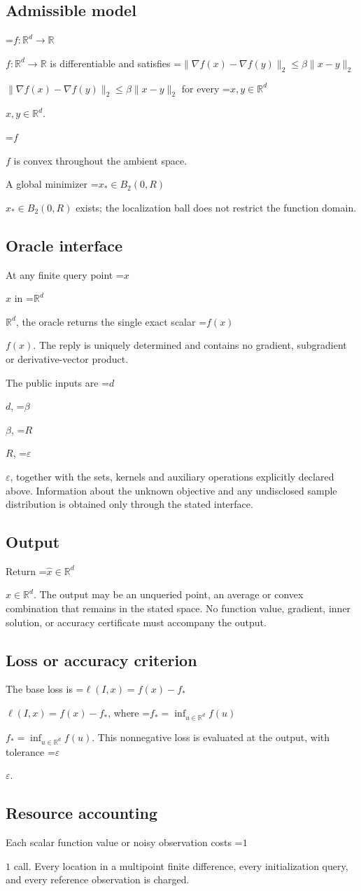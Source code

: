 \documentclass[10pt,a4paper]{article}
\newcommand{\AtlasMath}[1]{\par\begingroup\centering\setbox0=\hbox{$\displaystyle #1$}\ifdim\wd0>1.4\linewidth\typeout{ATLAS WIDE FORMULA: \the\wd0}\fi\ifdim\wd0>\linewidth\resizebox{\linewidth}{!}{\box0}\else\box0\fi\par\endgroup}
\newcommand{\AtlasInlineMath}[1]{\begingroup\setbox0=\hbox{$#1$}\ifdim\wd0>.4\linewidth\endgroup\AtlasMath{#1}\else\endgroup$#1$\fi}
\begin{document}
\subsection{Admissible model}
\AtlasInlineMath{f:\mathbb{R}^d\to\mathbb{R}} is differentiable and satisfies \AtlasInlineMath{\|\nabla f(x)-\nabla f(y)\|_2\le\beta\|x-y\|_2} for every \AtlasInlineMath{x,y\in\mathbb{R}^d}.

\AtlasInlineMath{f} is convex throughout the ambient space.

A global minimizer \AtlasInlineMath{x_*\in B_2(0,R)} exists; the localization ball does not restrict the function domain.

\subsection{Oracle interface}
At any finite query point \AtlasInlineMath{x} in \AtlasInlineMath{\mathbb{R}^d}, the oracle returns the single exact scalar \AtlasInlineMath{f(x)}. The reply is uniquely determined and contains no gradient, subgradient or derivative-vector product.

The public inputs are \AtlasInlineMath{d}, \AtlasInlineMath{\beta}, \AtlasInlineMath{R}, \AtlasInlineMath{\varepsilon}, together with the sets, kernels and auxiliary operations explicitly declared above. Information about the unknown objective and any undisclosed sample distribution is obtained only through the stated interface.

\subsection{Output}
Return \AtlasInlineMath{\widehat{x}\in \mathbb{R}^d}. The output may be an unqueried point, an average or convex combination that remains in the stated space. No function value, gradient, inner solution, or accuracy certificate must accompany the output.

\subsection{Loss or accuracy criterion}
The base loss is \AtlasInlineMath{\ell(I,x)=f(x)-f_*}, where \AtlasInlineMath{f_*=\inf_{u\in \mathbb{R}^d}f(u)}. This nonnegative loss is evaluated at the output, with tolerance \AtlasInlineMath{\varepsilon}.

\subsection{Resource accounting}
Each scalar function value or noisy observation costs \AtlasInlineMath{1} call. Every location in a multipoint finite difference, every initialization query, and every reference observation is charged.
\end{document}
